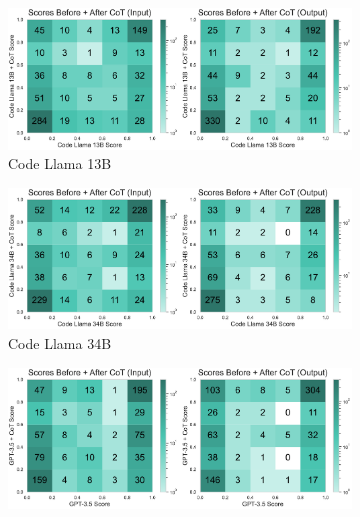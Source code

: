 \begin{figure}[H]
     \centering
     \begin{subfigure}[t]{0.49\textwidth}
         \centering
         \includegraphics[width=\textwidth]{figs/confusion_cot/cot_confusion_granular_codellama_13B.pdf}
         \caption{Code Llama 13B}
     \end{subfigure}%
     \hfill
     \begin{subfigure}[t]{0.49\textwidth}
         \centering
         \includegraphics[width=\textwidth]{figs/confusion_cot/cot_confusion_granular_codellama_30B.pdf}
         \caption{Code Llama 34B}
     \end{subfigure}
     \newline
     \newline
     \newline
     \begin{subfigure}[t]{0.49\textwidth}
         \centering
         \includegraphics[width=\textwidth]{figs/confusion_cot/cot_confusion_granular_gpt35.pdf}

\end{subfigure}
\end{figure}
